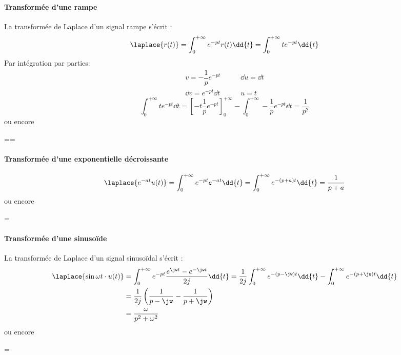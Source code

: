 \paragraph{Transformée d'une rampe}
La transformée de Laplace d'un signal rampe s'écrit :
$$
\laplace{r(t)}=\int_{0}^{+\infty} e^{-pt}r(t)\dd{t}=\int_{0}^{+\infty} te^{-pt}\dd{t}
$$
Par intégration par parties:
\begin{align*}
    v=-\dfrac{1}{p}e^{-pt}\qquad&\dd{u}=\dd{t}\\
    \dd{v}=e^{-pt}\dd{t}\qquad&u=t
\end{align*}
$$
\int_{0}^{+\infty} te^{-pt}\dd{t} = \left[-t\dfrac{1}{p}e^{-pt}\right]_0^{+\infty}-\int_{0}^{+\infty} -\dfrac{1}{p}e^{-pt}\dd{t}=\dfrac{1}{p^2}
$$
ou encore
\begin{bequation}
    ==
\end{bequation}

\paragraph{Transformée d'une exponentielle décroissante}

$$
\laplace{e^{-at}u(t)}=\int_{0}^{+\infty} e^{-pt}e^{-at}\dd{t}=\int_{0}^{+\infty} e^{-(p+a)t}\dd{t} = \dfrac{1}{p+a}
$$
ou encore
\begin{bequation}
    =
\end{bequation}

\paragraph{Transformée d'une sinuso\"ide}
La transformée de Laplace d'un signal sinuso\"idal s'écrit :
\begin{align*}
    \laplace{\sin{\omega t}\cdot u(t)}&=\int_{0}^{+\infty}e^{-pt}\dfrac{e^{\jw t}-e^{-\jw t}}{2j}\dd{t}=\dfrac{1}{2j}\int_{0}^{+\infty}e^{-(p-\jw)t}\dd{t} - \int_{0}^{+\infty}e^{-(p+\jw)t}\dd{t} \\
 &=\dfrac{1}{2j}\left( \dfrac{1}{p-\jw}-\dfrac{1}{p+\jw}\right)\\
 &=\dfrac{\omega}{p^2+\omega^2}
\end{align*}
ou encore
\begin{bequation}
    =
\end{bequation}



